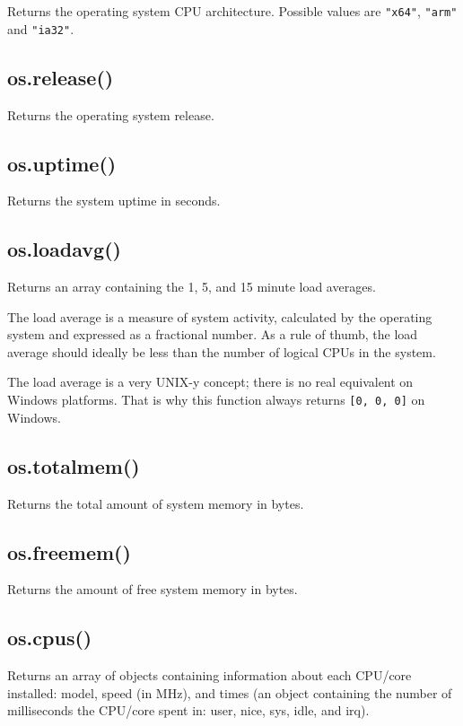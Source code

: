 Returns the operating system CPU architecture. Possible values are
\texttt{"x64"}, \texttt{"arm"} and \texttt{"ia32"}.

\subsection{os.release()}\label{os.release}

Returns the operating system release.

\subsection{os.uptime()}\label{os.uptime}

Returns the system uptime in seconds.

\subsection{os.loadavg()}\label{os.loadavg}

Returns an array containing the 1, 5, and 15 minute load averages.

The load average is a measure of system activity, calculated by the
operating system and expressed as a fractional number. As a rule of
thumb, the load average should ideally be less than the number of
logical CPUs in the system.

The load average is a very UNIX-y concept; there is no real equivalent
on Windows platforms. That is why this function always returns
\texttt{{[}0,\ 0,\ 0{]}} on Windows.

\subsection{os.totalmem()}\label{os.totalmem}

Returns the total amount of system memory in bytes.

\subsection{os.freemem()}\label{os.freemem}

Returns the amount of free system memory in bytes.

\subsection{os.cpus()}\label{os.cpus}

Returns an array of objects containing information about each CPU/core
installed: model, speed (in MHz), and times (an object containing the
number of milliseconds the CPU/core spent in: user, nice, sys, idle, and
irq).

